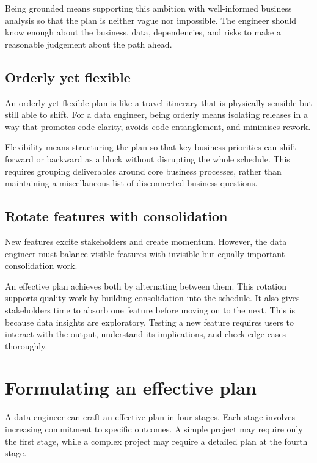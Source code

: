 \documentclass[10pt,openany,10pt]{book}
\begin{document}
Being grounded means supporting this ambition with well-informed
business analysis so that the plan is neither vague nor impossible. The
engineer should know enough about the business, data, dependencies, and
risks to make a reasonable judgement about the path ahead.

\subsection{Orderly yet flexible}\label{orderly-yet-flexible}

An orderly yet flexible plan is like a travel itinerary that is
physically sensible but still able to shift. For a data engineer, being
orderly means isolating releases in a way that promotes code clarity,
avoids code entanglement, and minimises rework.

Flexibility means structuring the plan so that key business priorities
can shift forward or backward as a block without disrupting the whole
schedule. This requires grouping deliverables around core business
processes, rather than maintaining a miscellaneous list of disconnected
business questions.

\subsection{Rotate features with
consolidation}\label{rotate-features-with-consolidation}

New features excite stakeholders and create momentum. However, the data
engineer must balance visible features with invisible but equally
important consolidation work.

An effective plan achieves both by alternating between them. This
rotation supports quality work by building consolidation into the
schedule. It also gives stakeholders time to absorb one feature before
moving on to the next. This is because data insights are exploratory.
Testing a new feature requires users to interact with the output,
understand its implications, and check edge cases thoroughly.

\section{Formulating an effective
plan}\label{formulating-an-effective-plan}

A data engineer can craft an effective plan in four stages. Each stage
involves increasing commitment to specific outcomes. A simple project
may require only the first stage, while a complex project may require a
detailed plan at the fourth stage.
\end{document}
